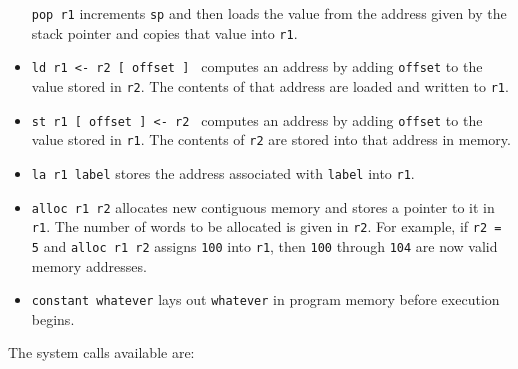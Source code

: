\documentclass[]{article}
\begin{document}
\begin{itemize}
  \texttt{pop   r1} increments \texttt{sp} and then loads the value from
  the address given by the stack pointer and copies that value into
  \texttt{r1}.
\item
  \texttt{ld r1 \textless{}- r2 {[} offset {]} } computes an address by
  adding \texttt{offset} to the value stored in \texttt{r2}. The
  contents of that address are loaded and written to \texttt{r1}.
\item
  \texttt{st r1 {[} offset {]} \textless{}- r2 } computes an address by
  adding \texttt{offset} to the value stored in \texttt{r1}. The
  contents of \texttt{r2} are stored into that address in memory.
\item
  \texttt{la r1 label} stores the address associated with \texttt{label}
  into \texttt{r1}.
\item
  \texttt{alloc r1 r2} allocates new contiguous memory and stores a
  pointer to it in \texttt{r1}. The number of words to be allocated is
  given in \texttt{r2}. For example, if \texttt{r2 = 5} and
  \texttt{alloc r1   r2} assigns \texttt{100} into \texttt{r1}, then
  \texttt{100} through \texttt{104} are now valid memory addresses.
\item
  \texttt{constant whatever} lays out \texttt{whatever} in program
  memory before execution begins.
\end{itemize}

The system calls available are:
\end{document}
